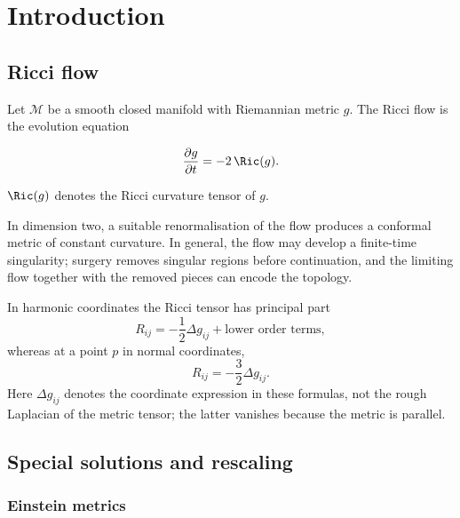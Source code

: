 \chapter{Introduction}

\section{Ricci flow}

Let $\mathcal M$ be a smooth closed manifold with Riemannian metric $g$. The
Ricci flow is the evolution equation

\begin{definition}
\label{topping-intro-ricci-flow-evolution}



\[
\frac{\partial g}{\partial t}=-2\,\Ric(g).
\]
\end{definition}

\begin{remark}
\label{topping-intro-ricci-curvature}


$\Ric(g)$ denotes the Ricci curvature tensor of $g$.
\end{remark}

In dimension two, a suitable renormalisation of the flow produces a conformal
metric of constant curvature. In general, the flow may develop a finite-time
singularity; surgery removes singular regions before continuation, and the
limiting flow together with the removed pieces can encode the topology.

In harmonic coordinates the Ricci tensor has principal part
\[
R_{ij}=-\frac12\Delta g_{ij}+\text{lower order terms},
\]
whereas at a point $p$ in normal coordinates,
\[
R_{ij}=-\frac32\Delta g_{ij}.
\]
Here $\Delta g_{ij}$ denotes the coordinate expression in these formulas, not
the rough Laplacian of the metric tensor; the latter vanishes because the
metric is parallel.

\section{Special solutions and rescaling}

\subsection{Einstein metrics}

